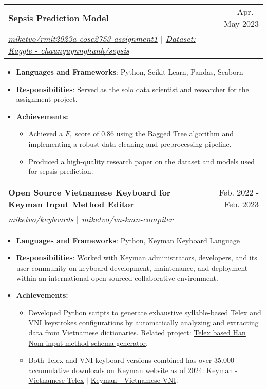 \documentclass[a4paper,11pt]{article}
\makeatletter
\newcommand{\resumeItemHeading}[1]{\item\small{\textbf{#1:}}\vspace{-1.6pt}}
\newcommand{\resumeItemPlain}[1]{
  \setstretch{0.96}
  \item\small{
    {#1 \vspace{-1pt}}
  }
  \setstretch{1.0}
}
\newcommand{\resumeItem}[2]{
  \item\small{
    \textbf{#1}{: #2 \vspace{-2pt}}
  }
}
\newcommand{\resumeSubheading}[4]{
  \vspace{-2pt}\item
    \begin{tabular*}{0.97\textwidth}{l@{\extracolsep{\fill}}r}
      \textbf{#1} & #2 \\
      \textit{\small#3} & \textit{\small #4} \\
    \end{tabular*}\vspace{-5pt}
}
\newcommand{\resumeItemListStart}{\begin{itemize}[leftmargin=16pt]}
\newcommand{\resumeItemListEnd}{\end{itemize}\vspace{-2pt}}
\newcommand{\resumeSubItemListStart}{\begin{itemize}[leftmargin=*]}
\newcommand{\resumeSubItemListEnd}{\end{itemize}\vspace{-2pt}}
\makeatother
\begin{document}
    \resumeSubheading
      {Sepsis Prediction Model}{Apr. - May 2023}
      {\href{https://github.com/miketvo/rmit2023a-cosc2753-assignment1}{\faGithub\space miketvo/rmit2023a-cosc2753-assignment1} $|$ \href{https://www.kaggle.com/datasets/chaunguynnghunh/sepsis/}{\faDatabase\space Dataset: Kaggle - chaunguynnghunh/sepsis}}{}
      \resumeItemListStart
        \resumeItem{Languages and Frameworks}
          {Python, Scikit-Learn, Pandas, Seaborn}
        \resumeItem{Responsibilities}
          {Served as the solo data scientist and researcher for the assignment project.}
        \resumeItemHeading{Achievements}
          \resumeSubItemListStart
            \resumeItemPlain
              {Achieved a $F_1$ score of 0.86 using the Bagged Tree algorithm and implementing a robust data cleaning and preprocessing pipeline.}
            \resumeItemPlain
              {Produced a high-quality research paper on the dataset and models used for sepsis prediction.}
          \resumeSubItemListEnd
      \resumeItemListEnd
  
      \resumeSubheading
        {Open Source Vietnamese Keyboard for Keyman Input Method Editor}{Feb. 2022 - Feb. 2023}
        {\href{https://github.com/miketvo/keyboards}{\faGithub\space miketvo/keyboards} $|$ \href{https://github.com/miketvo/vn-kmn-compiler}{\faGithub\space miketvo/vn-kmn-compiler}}{}
        \resumeItemListStart
          \resumeItem{Languages and Frameworks}
            {Python, Keyman Keyboard Language}
          \resumeItem{Responsibilities}
            {Worked with Keyman administrators, developers, and its user community on keyboard development, maintenance, and deployment within an international open-sourced collaborative environment.}
          \resumeItemHeading{Achievements}
            \resumeSubItemListStart
              \resumeItemPlain
                {Developed Python scripts to generate exhaustive syllable-based Telex and VNI keystrokes configurations by automatically analyzing and extracting data from Vietnamese dictionaries. Related project: \href{https://github.com/miketvo/rime-ime-han-nom-data}{\faGithub\space Telex based Han Nom input method schema generator}.}
              \resumeItemPlain
                {Both Telex and VNI keyboard versions combined has over 35.000 accumulative downloads on Keyman website as of 2024: \href{https://keyman.com/keyboards/vietnamese_telex}{\faGlobe\space Keyman - Vietnamese Telex} $|$ \href{https://keyman.com/keyboards/vietnamese_vni}{\faGlobe\space Keyman - Vietnamese VNI}.}
            \resumeSubItemListEnd
      \resumeItemListEnd
\end{document}
